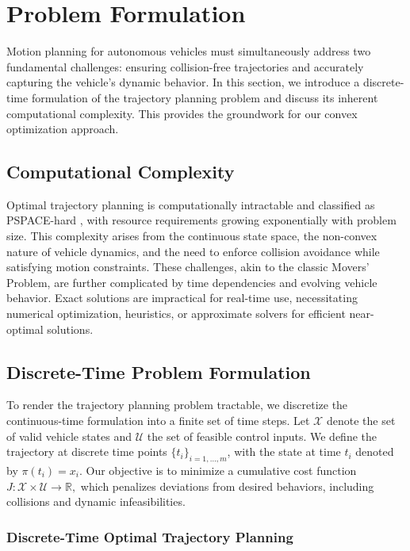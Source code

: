 \section{Problem Formulation} \label{sec:convex_discrete_time_optimization}

Motion planning for autonomous vehicles must simultaneously address two fundamental challenges: ensuring collision-free trajectories and accurately
capturing the vehicle's dynamic behavior.
In this section, we introduce a discrete-time formulation of the trajectory planning problem and discuss its inherent computational complexity.
This provides the groundwork for our convex optimization approach.

\subsection{Computational Complexity} \label{subsec:complexity}

Optimal trajectory planning is computationally intractable and classified as PSPACE-hard \cite{reif_complexity_1979}, with resource requirements
growing exponentially with problem size.
This complexity arises from the continuous state space, the non-convex nature of vehicle dynamics, and the need to enforce collision avoidance while
satisfying motion constraints.
These challenges, akin to the classic Movers' Problem, are further complicated by time dependencies and evolving vehicle behavior.
Exact solutions are impractical for real-time use, necessitating numerical optimization, heuristics, or approximate solvers for efficient
near-optimal solutions.

\subsection{Discrete-Time Problem Formulation}

To render the trajectory planning problem tractable, we discretize the continuous-time formulation into a finite set of time steps.
Let $\mathcal{X}$ denote the set of valid vehicle states and $\mathcal{U}$ the set of feasible control inputs.
We define the trajectory at discrete time points $\{t_i\}_{i=1,\dots ,m}$, with the state at time $t_i$ denoted by $\pi(t_i) = x_i$.
Our objective is to minimize a cumulative cost function $ J: \mathcal{X} \times \mathcal{U} \to \mathbb{R}, $ which penalizes deviations from desired
behaviors, including collisions and dynamic infeasibilities.

\subsubsection{Discrete-Time Optimal Trajectory Planning}\label{subsubsec:discrete_time_optimal_trajectory_planning}

